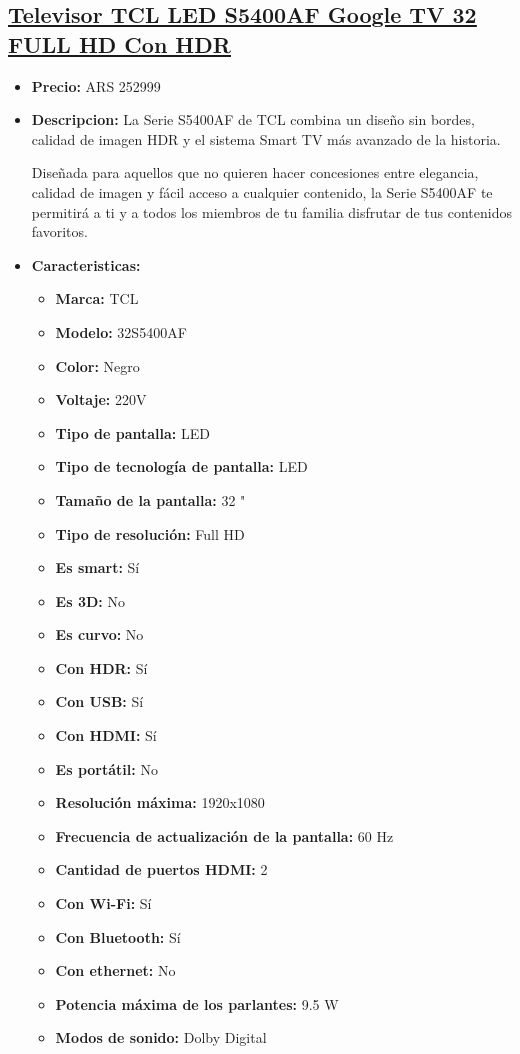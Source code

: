 \documentclass{article}
\begin{document}
    \begin{adjustwidth}{2em}{}

    \subsection{\underline{\href{https://www.mercadolibre.com.ar/televisor-tcl-led-s5400af-google-tv-32-full-hd-con-hdr/p/MLA27649309}{Televisor TCL LED S5400AF Google TV 32 FULL HD Con HDR}}}
    \begin{itemize}
        \item \textbf{Precio:} ARS 252999
        \item \textbf{Descripcion:} La Serie S5400AF de TCL combina un diseño sin bordes, calidad de imagen HDR y el sistema Smart TV más avanzado de la historia.

Diseñada para aquellos que no quieren hacer concesiones entre elegancia, calidad de imagen y fácil acceso a cualquier contenido, la Serie S5400AF te permitirá a ti y a todos los miembros de tu familia disfrutar de tus contenidos favoritos.
        \item \textbf{Caracteristicas:} 
        \begin{itemize}
            \item \textbf {Marca:} TCL
    \item \textbf {Modelo:} 32S5400AF
    \item \textbf {Color:} Negro
    \item \textbf {Voltaje:} 220V
    \item \textbf {Tipo de pantalla:} LED
    \item \textbf {Tipo de tecnología de pantalla:} LED
    \item \textbf {Tamaño de la pantalla:} 32 "
    \item \textbf {Tipo de resolución:} Full HD
    \item \textbf {Es smart:} Sí
    \item \textbf {Es 3D:} No
    \item \textbf {Es curvo:} No
    \item \textbf {Con HDR:} Sí
    \item \textbf {Con USB:} Sí
    \item \textbf {Con HDMI:} Sí
    \item \textbf {Es portátil:} No
    \item \textbf {Resolución máxima:} 1920x1080
    \item \textbf {Frecuencia de actualización de la pantalla:} 60 Hz
    \item \textbf {Cantidad de puertos HDMI:} 2
    \item \textbf {Con Wi-Fi:} Sí
    \item \textbf {Con Bluetooth:} Sí
    \item \textbf {Con ethernet:} No
    \item \textbf {Potencia máxima de los parlantes:} 9.5 W
    \item \textbf {Modos de sonido:} Dolby Digital
        \end{itemize}
    \end{itemize}


\end{adjustwidth}
\end{document}
